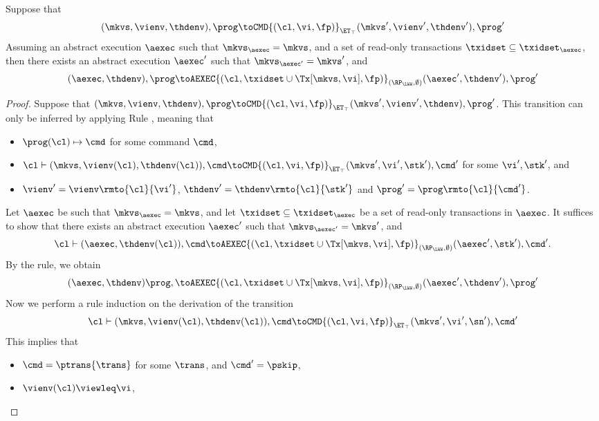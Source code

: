 \begin{proposition}
\label{prop:kv2aexec_transition}
Suppose that 
\[(\mkvs, \vienv, \thdenv), \prog \toCMD{(\cl, \vi, \fp)}_{\ET_{\top}} (\mkvs', \vienv', \thdenv'), \prog'\]
Assuming an abstract execution $\aexec$ 
such that $\mkvs_{\aexec} = \mkvs$, and a set of read-only transactions $\txidset \subseteq \txidset_{\aexec}$,
then there exists an abstract execution $\aexec'$ such that $\mkvs_{\aexec'} = \mkvs'$, and 
\[
(\aexec, \thdenv), \prog \toAEXEC{(\cl, \txidset \cup \Tx[\mkvs, \vi], \fp)}_{(\RP_{\LWW}, \emptyset)}
(\aexec', \thdenv'), \prog'
\]
\end{proposition}
\begin{proof}
Suppose that $(\mkvs, \vienv, \thdenv), \prog \toCMD{(\cl, \vi, \fp)}_{\ET_{\top}} (\mkvs', \vienv', \thdenv), \prog'$. 
This transition can only be inferred by applying Rule , meaning that 
\begin{itemize}
\item $\prog(\cl) \mapsto \cmd$ for some command $\cmd$, 
\item $\cl \vdash (\mkvs, \vienv(\cl), \thdenv(\cl)), \cmd \toCMD{(\cl, \vi, \fp)}_{\ET_{\top}} (\mkvs', \vi', \stk'), \cmd'$ 
for some $\vi', \stk'$, and 
\item $\vienv' = \vienv\rmto{\cl}{\vi'}$, $\thdenv' = \thdenv\rmto{\cl}{\stk'}$ and $\prog' = \prog\rmto{\cl}{\cmd'}$. 
\end{itemize}
Let $\aexec$ be such that $\mkvs_{\aexec} = \mkvs$, and let $\txidset \subseteq \txidset_{\aexec}$ be a set of read-only transactions in $\aexec$. 
It suffices to show that there exists an abstract execution $\aexec'$ such that 
$\mkvs_{\aexec'} = \mkvs'$, and 
\[
    \cl \vdash (\aexec, \thdenv(\cl)), \cmd \toAEXEC{(\cl, \txidset \cup \Tx[\mkvs, \vi], \fp)}_{(\RP_{\LWW}, \emptyset)} (\aexec', \stk'), \cmd'.
\]
By the  rule, we obtain 
\[ 
    (\aexec, \thdenv) \prog, \toAEXEC{(\cl, \txidset \cup \Tx[\mkvs,\vi], \fp)}_{(\RP_{\LWW}, \emptyset)} (\aexec' ,\thdenv'), \prog'
\]
Now we perform a rule induction on the derivation of the transition 
\[
    \cl \vdash (\mkvs, \vienv(\cl), \thdenv(\cl)), \cmd \toCMD{(\cl, \vi, \fp)}_{\ET_{\top}} (\mkvs', \vi', \sn'), \cmd'
\]
This implies that 
\begin{itemize}
\item $\cmd = \ptrans{\trans}$ for some $\trans$, and $\cmd' = \pskip$,
\item $\vienv(\cl) \viewleq \vi$, 

\end{itemize}
\end{proof}
